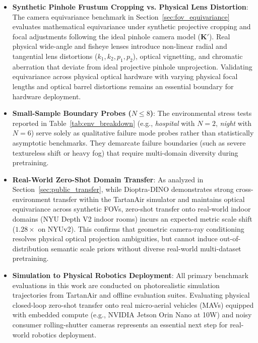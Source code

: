 \begin{itemize}
    \item \textbf{Synthetic Pinhole Frustum Cropping vs. Physical Lens Distortion}: The camera equivariance benchmark in Section~\ref{sec:fov_equivariance} evaluates mathematical equivariance under synthetic projective cropping and focal adjustments following the ideal pinhole camera model ($\mathbf{K}'$). Real physical wide-angle and fisheye lenses introduce non-linear radial and tangential lens distortions ($k_1, k_2, p_1, p_2$), optical vignetting, and chromatic aberration that deviate from ideal projective pinhole unprojection. Validating equivariance across physical optical hardware with varying physical focal lengths and optical barrel distortions remains an essential boundary for hardware deployment.
    \item \textbf{Small-Sample Boundary Probes ($N \le 8$)}: The environmental stress tests reported in Table~\ref{tab:env_breakdown} (e.g., \textit{hospital} with $N=2$, \textit{night} with $N=6$) serve solely as qualitative failure mode probes rather than statistically asymptotic benchmarks. They demarcate failure boundaries (such as severe textureless shift or heavy fog) that require multi-domain diversity during pretraining.
    \item \textbf{Real-World Zero-Shot Domain Transfer}: As analyzed in Section~\ref{sec:public_transfer}, while Dioptra-DINO demonstrates strong cross-environment transfer within the TartanAir simulator and maintains optical equivariance across synthetic FOVs, zero-shot transfer onto real-world indoor domains (NYU Depth V2 indoor rooms) incurs an expected metric scale shift ($1.28\times$ on NYUv2). This confirms that geometric camera-ray conditioning resolves physical optical projection ambiguities, but cannot induce out-of-distribution semantic scale priors without diverse real-world multi-dataset pretraining.
    \item \textbf{Simulation to Physical Robotics Deployment}: All primary benchmark evaluations in this work are conducted on photorealistic simulation trajectories from TartanAir and offline evaluation suites. Evaluating physical closed-loop zero-shot transfer onto real micro-aerial vehicles (MAVs) equipped with embedded compute (e.g., NVIDIA Jetson Orin Nano at 10W) and noisy consumer rolling-shutter cameras represents an essential next step for real-world robotics deployment.
\end{itemize}
